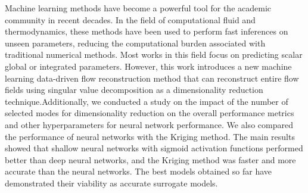


Machine learning methods have become a powerful tool for the academic community in recent decades. In the field of computational fluid and thermodynamics, these methods have been used to perform fast inferences on unseen parameters, reducing the computational burden associated with traditional numerical methods. Most works in this field focus on predicting scalar global or integrated parameters. However, this work introduces a new machine learning data-driven flow reconstruction method that can reconstruct entire flow fields using singular value decomposition as a dimensionality reduction technique.Additionally, we conducted a study on the impact of the number of selected modes for dimensionality reduction on the overall performance metrics and other hyperparameters for neural network performance. We also compared the performance of neural networks with the Kriging method. The main results showed that shallow neural networks with sigmoid activation functions performed better than deep neural networks, and the Kriging method was faster and more accurate than the neural networks. The best models obtained so far have demonstrated their viability as accurate surrogate models.


